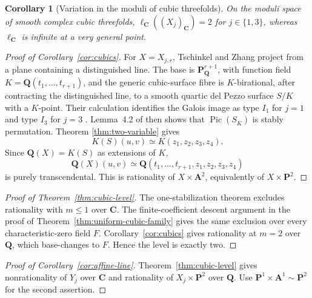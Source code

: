 \documentclass[11pt]{article}
\newtheorem{corollary}[theorem]{Corollary}
\theoremstyle{remark}
\newcommand{\A}{\mathbf A}
\newcommand{\C}{\mathbf C}
\newcommand{\PP}{\mathbf P}
\newcommand{\Pic}{\operatorname{Pic}}
\begin{document}
\begin{corollary}[Variation in the moduli of cubic threefolds]
\label{cor:moduli}
%
%
%
On the moduli space of smooth complex cubic threefolds,
\(\ell_{\C}((X_j)_{\C})=2\) for \(j\in\{1,3\}\), whereas
\(\ell_{\C}\) is infinite at a very general point.
\end{corollary}

\begin{proof}[Proof of Corollary~\ref{cor:cubics}]
For \(X=X_{j,r}\), Tschinkel and Zhang project from a plane containing a
distinguished line.  The base is \(\PP^{r+1}_{\mathbf Q}\), with function
field \(K=\mathbf Q(t_1,\ldots,t_{r+1})\), and the generic cubic-surface
fibre is \(K\)-birational, after contracting the distinguished line, to a
smooth quartic del Pezzo surface \(S/K\) with a \(K\)-point.  Their
calculation identifies the Galois image as type \(I_1\) for \(j=1\) and type
\(I_3\) for \(j=3\) \cite[Propositions~5.1 and~5.3]{TZ}.  Lemma~4.2 of
\cite{TZ} then shows that \(\Pic(S_{\bar K})\) is stably permutation.  Theorem
\ref{thm:two-variable} gives
\[
 K(S)(u,v)\simeq K(z_1,z_2,z_3,z_4).
\]
Since \(\mathbf Q(X)=K(S)\) as extensions of \(K\),
\[
 \mathbf Q(X)(u,v)
 \simeq\mathbf Q(t_1,\ldots,t_{r+1},z_1,z_2,z_3,z_4)
\]
is purely transcendental.  This is rationality of \(X\times\A^2\),
equivalently of \(X\times\PP^2\).
%
%
\end{proof}

\begin{proof}[Proof of Theorem~\ref{thm:cubic-level}]
The one-stabilization theorem \cite[Theorem~1.1]{RuddM1} excludes
rationality with \(m\leq1\) over \(\C\). The finite-coefficient descent
argument in the proof of Theorem~\ref{thm:uniform-cubic-family} gives the
same exclusion over every characteristic-zero field \(F\).
Corollary~\ref{cor:cubics} gives rationality at \(m=2\) over
\(\mathbf Q\), which base-changes to \(F\).  Hence the level is exactly two.
%
%
\end{proof}

\begin{proof}[Proof of Corollary~\ref{cor:affine-line}]
Theorem~\ref{thm:cubic-level} gives nonrationality of \(Y_j\) over \(\C\)
and rationality of \(X_j\times\PP^2\) over \(\mathbf Q\).
Use \(\PP^1\times\A^1\sim\PP^2\) for the second assertion.
%
\end{proof}
\end{document}
